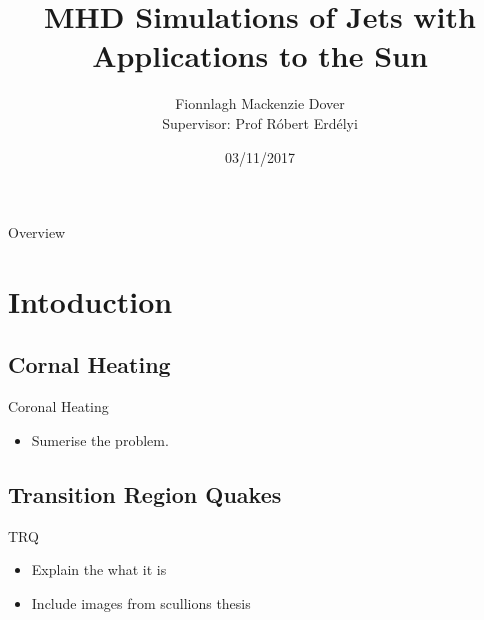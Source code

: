 \documentclass{beamer}
\title[ ]{MHD Simulations of Jets with Applications to the Sun} %
\author[Fionnlagh Mackenzie Dover]{Fionnlagh Mackenzie Dover \\ Supervisor: Prof R\'{o}bert Erd\'{e}lyi } %
\institute[SP$^2$RC] %
{
University of Sheffield \\ %
\medskip
}
\date{03/11/2017} %
\begin{document}
\begin{frame}
\titlepage %
\end{frame}

\begin{frame}{Overview}

\tableofcontents %
\end{frame}


\section{Intoduction} %
\subsection{Cornal Heating}
\begin{frame}
\begin{block}{Coronal Heating}
\begin{itemize}
\item Sumerise the problem. 
\end{itemize}
\end{block}
\end{frame}

\subsection{Transition Region Quakes} %
\begin{frame}
\begin{block}{TRQ}
\begin{itemize}
\item Explain the what it is
\item Include images from scullions thesis
\end{itemize}
\end{block}
\end{frame}
\end{document}
